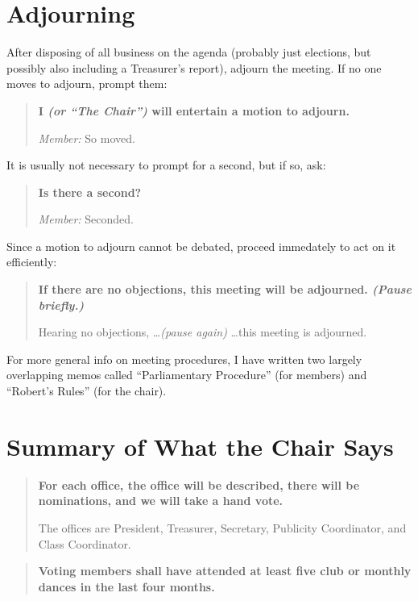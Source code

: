 \documentclass{article}
\newenvironment{chairsays}
               {\parskip 0pt \par %
                \begin{quote}
                 \parskip 0pt \bf}
               {\end{quote}}
\begin{document}
\section{Adjourning}

After disposing of all business on the agenda (probably just
elections, but possibly also including a Treasurer's report),
adjourn the meeting.  If no one moves to adjourn, prompt them:

\begin{chairsays}
I \emph{(or \emph{``The Chair''})} will entertain a motion to adjourn.

{\em Member:\/} So moved.
\end{chairsays}

It is usually not necessary to prompt for a second, but if so, ask:

\begin{chairsays}
Is there a second?

{\em Member:\/} Seconded.
\end{chairsays}

Since a motion to adjourn cannot be debated, proceed immedately to act
on it efficiently:

\begin{chairsays}
If there are no objections, this meeting will be adjourned.
{\em (Pause briefly.)}

Hearing no objections, \ldots {\em (pause again)} \ldots this meeting
is adjourned.
\end{chairsays}

For more general info on meeting procedures, I have written two largely
overlapping memos called ``Parliamentary Procedure'' (for members) and
``Robert's Rules'' (for the chair).

\newpage

\section{Summary of What the Chair Says}

\begin{chairsays}
For each office, the office will be described, there will be
nominations, and we will take a hand vote.

The offices are
President, Treasurer,
Secretary, Publicity Coordinator, and Class Coordinator.
\end{chairsays}

\begin{chairsays}
Voting members shall have attended at least five club or monthly dances in
the last four months.
\end{chairsays}
\end{document}
